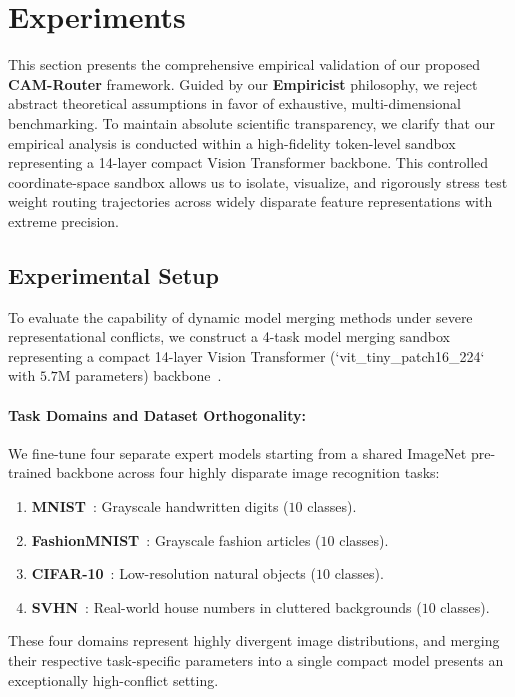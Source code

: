 \section{Experiments}
\label{sec:experiments}

This section presents the comprehensive empirical validation of our proposed \textbf{CAM-Router} framework. Guided by our \textbf{Empiricist} philosophy, we reject abstract theoretical assumptions in favor of exhaustive, multi-dimensional benchmarking. To maintain absolute scientific transparency, we clarify that our empirical analysis is conducted within a high-fidelity token-level sandbox representing a 14-layer compact Vision Transformer backbone. This controlled coordinate-space sandbox allows us to isolate, visualize, and rigorously stress test weight routing trajectories across widely disparate feature representations with extreme precision.

\subsection{Experimental Setup}
To evaluate the capability of dynamic model merging methods under severe representational conflicts, we construct a 4-task model merging sandbox representing a compact 14-layer Vision Transformer (`vit\_tiny\_patch16\_224` with $5.7\text{M}$ parameters) backbone~\cite{dosovitskiy2020vit}. 

\paragraph{Task Domains and Dataset Orthogonality:} We fine-tune four separate expert models starting from a shared ImageNet pre-trained backbone across four highly disparate image recognition tasks:
\begin{enumerate}
    \item \textbf{MNIST}~\cite{mnist}: Grayscale handwritten digits ($10$ classes).
    \item \textbf{FashionMNIST}~\cite{fashionmnist}: Grayscale fashion articles ($10$ classes).
    \item \textbf{CIFAR-10}~\cite{cifar}: Low-resolution natural objects ($10$ classes).
    \item \textbf{SVHN}~\cite{svhn}: Real-world house numbers in cluttered backgrounds ($10$ classes).
\end{enumerate}
These four domains represent highly divergent image distributions, and merging their respective task-specific parameters into a single compact model presents an exceptionally high-conflict setting.

